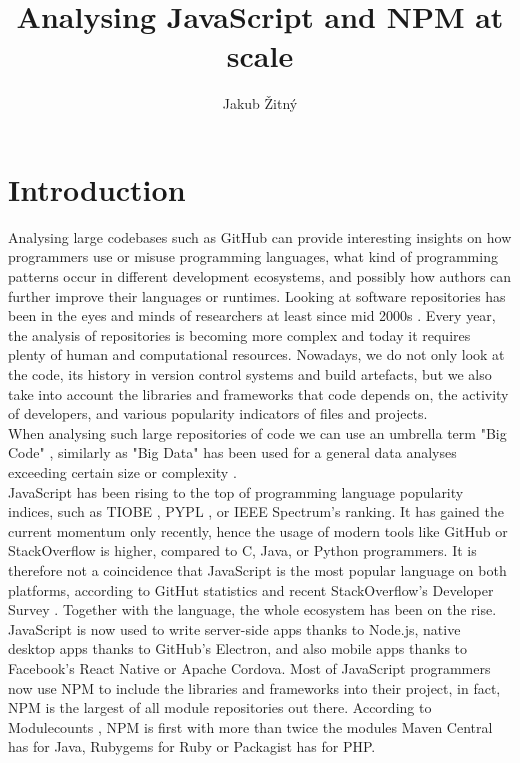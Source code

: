 \documentclass[thesis=M,english]{FITthesis}[2012/10/20]
\title{Analysing JavaScript and NPM at scale}
\author{Jakub Žitný} %
\begin{document}

\chapter{Introduction}

Analysing large codebases such as GitHub can provide interesting insights on how programmers use or misuse programming languages, what kind of programming patterns occur in different development ecosystems, and possibly how authors can further improve their languages or runtimes. Looking at software repositories has been in the eyes and minds of researchers at least since mid 2000s \cite{msr_1}. Every year, the analysis of repositories is becoming more complex and today it requires plenty of human and computational resources. Nowadays, we do not only look at the code, its history in version control systems \cite{msr_2} and build artefacts, but we also take into account the libraries and frameworks that code depends on, the activity of developers, and various popularity indicators of files and projects. \\


When analysing such large repositories of code we can use an umbrella term "Big Code" \cite{darpa, jsnice}, similarly as "Big Data" has been used for a general data analyses exceeding certain size or complexity \cite{bigdata}. \\


JavaScript has been rising to the top of programming language popularity indices, such as TIOBE \cite{tiobe_index}, PYPL \cite{pypl_index}, or IEEE Spectrum's ranking. It has gained the current momentum only recently, hence the usage of modern tools like GitHub or StackOverflow is higher, compared to C, Java, or Python programmers. It is therefore not a coincidence that JavaScript is the most popular language on both platforms, according to GitHut statistics \cite{githut} and recent StackOverflow's Developer Survey \cite{so1}. Together with the language, the whole ecosystem has been on the rise. JavaScript is now used to write server-side apps thanks to Node.js, native desktop apps thanks to GitHub's Electron, and also mobile apps thanks to Facebook's React Native or Apache Cordova. Most of JavaScript programmers now use NPM to include the libraries and frameworks into their project, in fact, NPM is the largest of all module repositories out there. According to Modulecounts \cite{modulecounts}, NPM is first with more than twice the modules Maven Central has for Java, Rubygems for Ruby or Packagist has for PHP. \\
\end{document}
